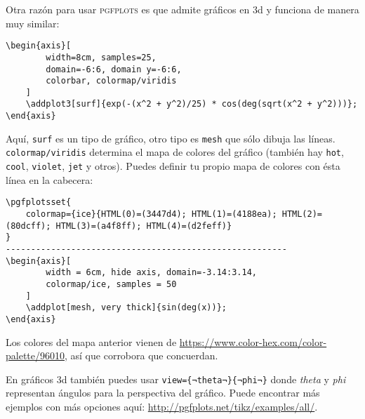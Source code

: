 Otra razón para usar \textsc{pgfplots} es que admite gráficos en 3d y funciona de manera muy similar:
\begin{lstlisting}
\begin{axis}[
		width=8cm, samples=25,
		domain=-6:6, domain y=-6:6,
		colorbar, colormap/viridis
	]
	\addplot3[surf]{exp(-(x^2 + y^2)/25) * cos(deg(sqrt(x^2 + y^2)))};
\end{axis}
\end{lstlisting}
\begin{figure}[!h]
	\centering
\end{figure}

Aquí, \texttt{surf} es un tipo de gráfico, otro tipo es \texttt{mesh} que sólo dibuja las líneas. \texttt{colormap/viridis} determina el mapa de colores del gráfico (también hay \texttt{hot}, \texttt{cool}, \texttt{violet}, \texttt{jet} y otros). Puedes definir tu propio mapa de colores con ésta línea en la cabecera:
\begin{lstlisting}
\pgfplotsset{
	colormap={ice}{HTML(0)=(3447d4); HTML(1)=(4188ea); HTML(2)=(80dcff); HTML(3)=(a4f8ff); HTML(4)=(d2feff)}
}
--------------------------------------------------------
\begin{axis}[
		width = 6cm, hide axis, domain=-3.14:3.14,
		colormap/ice, samples = 50
	]
	\addplot[mesh, very thick]{sin(deg(x))};
\end{axis}
\end{lstlisting}
\begin{figure}[!h]
	\centering
\end{figure}

Los colores del mapa anterior vienen de \url{https://www.color-hex.com/color-palette/96010}, así que corrobora que concuerdan.

En gráficos 3d también puedes usar \lstinline|view={¬theta¬}{¬phi¬}| donde \textit{theta} y \textit{phi} representan ángulos para la perspectiva del gráfico. Puede encontrar más ejemplos con más opciones aquí: \url{http://pgfplots.net/tikz/examples/all/}.

